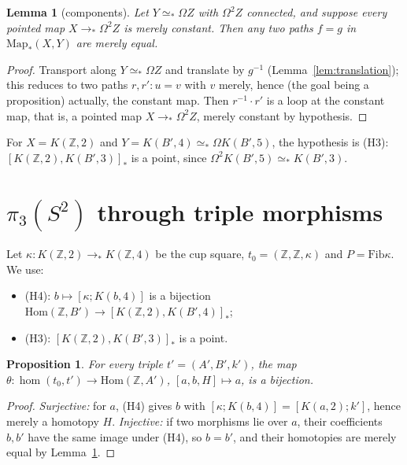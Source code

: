 \documentclass[11pt]{amsart}
\newtheorem{proposition}[theorem]{Proposition}
\newtheorem{lemma}[theorem]{Lemma}
\theoremstyle{definition}
\theoremstyle{remark}
\newcommand{\Om}{\Omega}
\newcommand{\Fib}{\mathrm{Fib}}
\newcommand{\Hom}{\mathrm{Hom}}
\newcommand{\Map}{\mathrm{Map}_*}
\newcommand{\Z}{\mathbb{Z}}
\newcommand{\cls}[1]{[#1]}
\newcommand{\cmp}{\mathbin{;}}
\begin{document}
\begin{lemma}[components]\label{lem:components}
Let $Y\simeq_*\Om Z$ with $\Om^2Z$ connected, and suppose every pointed map
$X\to_*\Om^2Z$ is merely constant. Then any two paths $f=g$ in $\Map(X,Y)$ are
merely equal.
\end{lemma}
\begin{proof}
Transport along $Y\simeq_*\Om Z$ and translate by $g^{-1}$
(Lemma~\ref{lem:translation}); this reduces to two paths $r,r':u=v$ with $v$
merely, hence (the goal being a proposition) actually, the constant map. Then
$r^{-1}\cdot r'$ is a loop at the constant map, that is, a pointed map
$X\to_*\Om^2Z$, merely constant by hypothesis.
\end{proof}

\noindent For $X=K(\Z,2)$ and $Y=K(B',4)\simeq_*\Om K(B',5)$, the hypothesis is
(H3): $[K(\Z,2),K(B',3)]_*$ is a point, since $\Om^2K(B',5)\simeq_*K(B',3)$.

\section{$\pi_3(S^2)$ through triple morphisms}\label{sec:pi3}

Let $\kappa:K(\Z,2)\to_*K(\Z,4)$ be the cup square, $t_0=(\Z,\Z,\kappa)$ and
$P=\Fib\kappa$. We use:
\begin{itemize}
\item (H4): $b\mapsto\cls{\kappa\cmp K(b,4)}$ is a bijection
$\Hom(\Z,B')\to[K(\Z,2),K(B',4)]_*$;
\item (H3): $[K(\Z,2),K(B',3)]_*$ is a point.
\end{itemize}

\begin{proposition}\label{prop:theta}
For every triple $t'=(A',B',k')$, the map $\theta:\hom(t_0,t')\to\Hom(\Z,A')$,
$\cls{a,b,H}\mapsto a$, is a bijection.
\end{proposition}
\begin{proof}
\emph{Surjective:} for $a$, (H4) gives $b$ with
$\cls{\kappa\cmp K(b,4)}=\cls{K(a,2)\cmp k'}$, hence merely a homotopy $H$.
\emph{Injective:} if two morphisms lie over $a$, their coefficients $b,b'$ have
the same image under (H4), so $b=b'$, and their homotopies are merely equal by
Lemma~\ref{lem:components}.
\end{proof}
\end{document}
